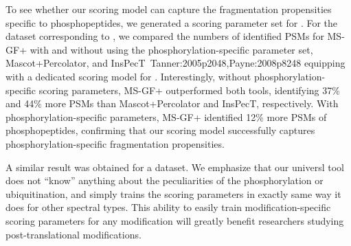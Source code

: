 To see whether our scoring model can capture the fragmentation propensities specific to phosphopeptides, we generated a scoring parameter set for .
For the dataset corresponding to , we compared the numbers of identified PSMs for MS-GF+ with and without using the phosphorylation-specific parameter set, Mascot+Percolator, and InsPecT~\cite{unv}{Tanner:2005p2048,Payne:2008p8248} equipping with a dedicated scoring model for .
Interestingly,  without phosphorylation-specific scoring parameters, MS-GF+ outperformed both tools,
identifying 37\% and 44\% more PSMs than Mascot+Percolator and InsPecT, respectively.
With phosphorylation-specific parameters, MS-GF+ identified  12\% more PSMs of phosphopeptides, confirming that our scoring model successfully captures phosphorylation-specific fragmentation propensities.

A similar result was obtained for a  dataset.
We emphasize that our universl tool  does not ``know'' anything about the peculiarities of the phosphorylation or ubiquitination,
and simply trains the scoring parameters in exactly same way it does for other spectral types.
This ability to easily train modification-specific scoring parameters for any modification 
will greatly benefit researchers studying post-translational modifications.



